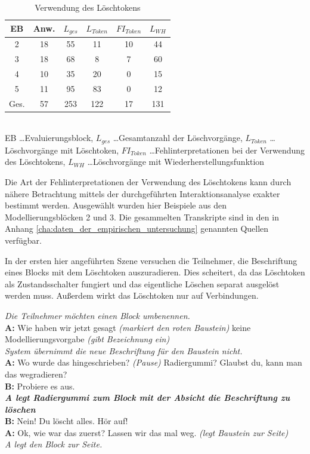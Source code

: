 \begin{table}[htbp]
	\centering
	\caption{Verwendung des Löschtokens}
\begin{tabular}{| c || c || c | c | c | c |}
  \hline
   EB    & Anw. & $L_{ges}$ & $L_{Token}$ & $FI_{Token}$ & $L_{WH}$ \\ \hline
   2     & 18 & 55 & 11 & 10 & 44 \\ 
   3     & 18 & 68 &  8 &  7 & 60 \\ 
   4     & 10 & 35 & 20 &  0 & 15 \\ 
   5     & 11 & 95 & 83 &  0 & 12 \\ \hline
   Ges.  & 57 & 253 & 122 & 17 & 131 \\ \hline
\end{tabular} \\
\footnotesize EB \ldots Evaluierungsblock, $L_{ges}$ \ldots Gesamtanzahl der Löschvorgänge, $L_{Token}$ \ldots Löschvorgänge mit Löschtoken, $FI_{Token}$ \ldots Fehlinterpretationen bei der Verwendung des Löschtokens, $L_{WH}$ \ldots Löschvorgänge mit Wiederherstellungsfunktion
	\label{tab:fehlinterpretationen}
\end{table}

Die Art der Fehlinterpretationen der Verwendung des Löschtokens kann durch nähere Betrachtung mittels der durchgeführten Interaktionsanalyse exakter bestimmt werden. Ausgewählt wurden hier Beispiele aus den Modellierungsblöcken 2 und 3. Die gesammelten Transkripte sind in den in Anhang \ref{cha:daten_der_empirischen_untersuchung} genannten Quellen verfügbar.

In der ersten hier angeführten Szene versuchen die Teilnehmer, die Beschriftung eines Blocks mit dem Löschtoken auszuradieren. Dies scheitert, da das Löschtoken als Zustandsschalter fungiert und das eigentliche Löschen separat ausgelöst werden muss. Außerdem wirkt das Löschtoken nur auf Verbindungen.

\begin{transkript}
	\emph{Die Teilnehmer möchten einen Block umbenennen.}\\
	\textbf{A:} Wie haben wir jetzt gesagt \emph{(markiert den roten Baustein)} keine Modellierungsvorgabe \emph{(gibt Bezeichnung ein)}\\
	\emph{System übernimmt die neue Beschriftung für den Baustein nicht.}\\
	\textbf{A:} Wo wurde das hingeschrieben? \emph{(Pause)} Radiergummi? Glaubst du, kann man das wegradieren?\\
	\textbf{B:} Probiere es aus.\\
	\textbf{\emph{A legt Radiergummi zum Block mit der Absicht die Beschriftung zu löschen}}\\
	\textbf{B:} Nein! Du löscht alles. Hör auf! \\
	\textbf{A:} Ok, wie war das zuerst? Lassen wir das mal weg. \emph{(legt Baustein zur Seite)}\\
	\emph{A legt den Block zur Seite.} 
\end{transkript}

